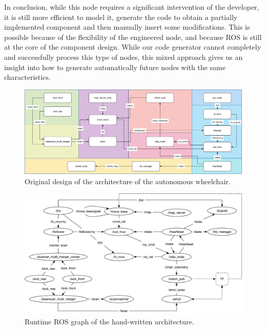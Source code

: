 In conclusion, while this node requires a significant intervention of the developer, it is still more efficient to model it, generate the code to obtain a partially implemented component and then manually insert some modifications. This is possible because of the flexibility of the engineered node, and because ROS is still at the core of the component design. While our code generator cannot completely and successfully process this type of nodes, this mixed approach gives us an insight into how to generate automatically future nodes with the same characteristics.


\begin{landscape}
	\begin{figure}[t]
	\centering
	\includegraphics[width=0.95\textheight]{gfx/pmk/softwarearchitecture}
	\caption{Original design of the architecture of the autonomous wheelchair.}
	\label{fig:pmk-doc}
	\end{figure}
\end{landscape}

\begin{landscape}
	\begin{figure}[t]
	\centering
	\includegraphics[width=0.95\textheight]{gfx/pmk/hand-graph}
	\caption{Runtime ROS graph of the hand-written architecture.}
	\label{fig:pmk-graph}
	\end{figure}
\end{landscape}


